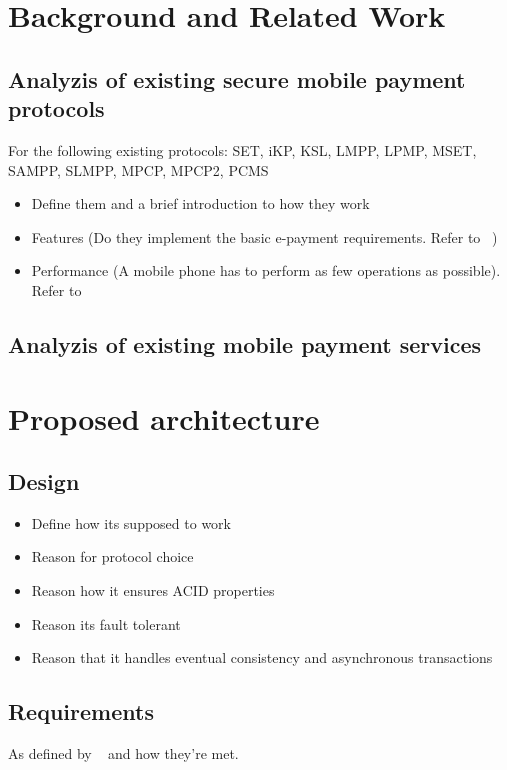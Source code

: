 \documentclass[11pt, a4paper]{article}
\begin{document}


\section{Background and Related Work}
\subsection{Analyzis of existing secure mobile payment protocols}
For the following existing protocols: SET, iKP, KSL, LMPP, LPMP, MSET, SAMPP, SLMPP, MPCP, MPCP2, PCMS
\begin{itemize}
    \item Define them and a brief introduction to how they work
    \item Features (Do they implement the basic e-payment requirements. Refer to ~\cite{epayment_requirements})
    \item Performance (A mobile phone has to perform as few operations as possible). Refer to ~\cite{mpp_comparisons}
\end{itemize}

\subsection{Analyzis of existing mobile payment services}

\section{Proposed architecture}
\subsection{Design}
\begin{itemize}
    \item Define how its supposed to work
    \item Reason for protocol choice
    \item Reason how it ensures ACID properties
    \item Reason its fault tolerant
    \item Reason that it handles eventual consistency and asynchronous transactions
\end{itemize}

\subsection{Requirements}
As defined by ~\cite{epayment_requirements} and how they're met.
\end{document}

